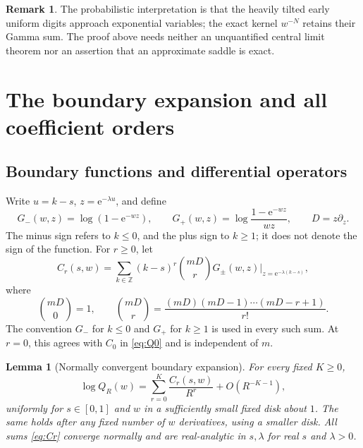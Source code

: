 \documentclass[11pt,a4paper]{article}
\numberwithin{equation}{section}
\newtheorem{lemma}[theorem]{Lemma}
\theoremstyle{definition}
\newtheorem{remark}[theorem]{Remark}
\newcommand{\Z}{\mathbb Z}
\newcommand{\ee}{\mathrm e}
\begin{document}
\begin{remark}
The probabilistic interpretation is that the heavily tilted early uniform digits approach exponential variables; the exact kernel $w^{-N}$ retains their Gamma sum. The proof above needs neither an unquantified central limit theorem nor an assertion that an approximate saddle is exact.
\end{remark}

\section{The boundary expansion and all coefficient orders}
\label{sec:boundary}

\subsection{Boundary functions and differential operators}
Write $u=k-s$, $z=\ee^{-\lambda u}$, and define
\begin{equation}
 G_-(w,z)=\log(1-\ee^{-wz}),\qquad
 G_+(w,z)=\log\frac{1-\ee^{-wz}}{wz},\qquad D=z\partial_z.
 \label{eq:G}
\end{equation}
The minus sign refers to $k\leq0$, and the plus sign to $k\geq1$; it does not denote the sign of the function. For $r\geq0$, let
\begin{equation}
 C_r(s,w)=\sum_{k\in\Z}(k-s)^r
 \binom{mD}{r}G_{\pm}(w,z)\bigg|_{z=\ee^{-\lambda(k-s)}},
 \label{eq:Cr}
\end{equation}
where
\[
 \binom{mD}{0}=1,\qquad
 \binom{mD}{r}=\frac{(mD)(mD-1)\cdots(mD-r+1)}{r!}.
\]
The convention $G_-$ for $k\leq0$ and $G_+$ for $k\geq1$ is used in every such sum. At $r=0$, this agrees with $C_0$ in \eqref{eq:Q0} and is independent of $m$.

\begin{lemma}[Normally convergent boundary expansion]
\label{lem:boundary}
For every fixed $K\geq0$,
\begin{equation}
 \log Q_R(w)=\sum_{r=0}^K\frac{C_r(s,w)}{R^r}+O(R^{-K-1}),
 \label{eq:boundary-expansion}
\end{equation}
uniformly for $s\in[0,1]$ and $w$ in a sufficiently small fixed disk about $1$. The same holds after any fixed number of $w$ derivatives, using a smaller disk. All sums \eqref{eq:Cr} converge normally and are real-analytic in $s,\lambda$ for real $s$ and $\lambda>0$.
\end{lemma}
\end{document}
